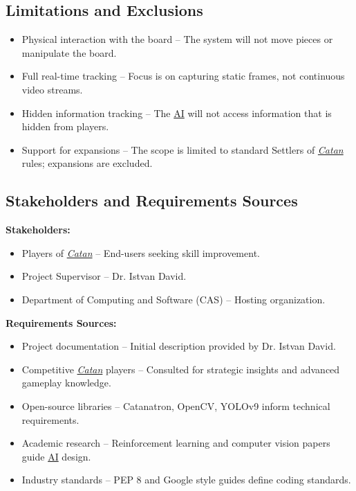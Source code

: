 \documentclass{article}
\newcommand{\Catan}{\href{https://en.wikipedia.org/wiki/Catan}{Catan}}
\newcommand{\AI}{\href{https://en.wikipedia.org/wiki/Artificial_intelligence}{AI}}
\begin{document}
\subsection{Limitations and Exclusions}\label{subsec:limitations-and-exclusions}
\begin{itemize}
    \item {Physical interaction with the board} – The system will not move pieces or manipulate the board.
    \item {Full real-time tracking} – Focus is on capturing static frames, not continuous video streams.
    \item {Hidden information tracking} – The \AI{} will not access information that is hidden from players.
    \item {Support for expansions} – The scope is limited to standard Settlers of \emph{\Catan{}} rules; expansions are excluded.
\end{itemize}

\subsection{Stakeholders and Requirements Sources}\label{subsec:stakeholders-and-requirements-sources}
\textbf{Stakeholders:}
\begin{itemize}
    \item Players of \emph{\Catan{}} – End-users seeking skill improvement.
    \item Project Supervisor – Dr. Istvan David.
    \item Department of Computing and Software (CAS) – Hosting organization.
\end{itemize}

\textbf{Requirements Sources:}
\begin{itemize}
    \item Project documentation – Initial description provided by Dr. Istvan David.
    \item Competitive \emph{\Catan{}} players – Consulted for strategic insights and advanced gameplay knowledge.
    \item Open-source libraries – Catanatron, OpenCV, YOLOv9 inform technical requirements.
    \item Academic research – Reinforcement learning and computer vision papers guide \AI{} design.
    \item Industry standards – PEP 8 and Google style guides define coding standards.
\end{itemize}
\end{document}
